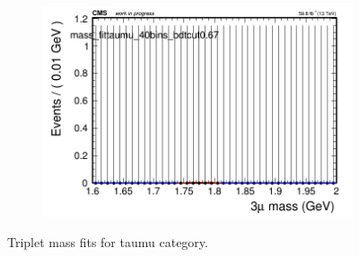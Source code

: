 \begin{figure}[H]
\begin{subfigure}{0.2\textwidth}
        \includegraphics[width=\textwidth]{power_law/plots/taumu/massfit_taumu_40bins_bdtcut0.67.png}
        \caption{}
    \end{subfigure}
    \caption{Triplet mass fits for taumu category.}
    \label{fig:powerlawtaumu}
\end{figure}

